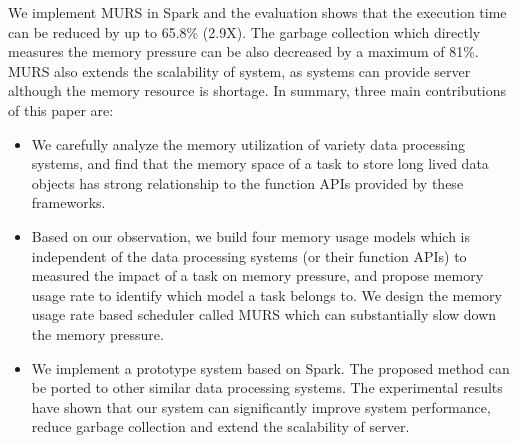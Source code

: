 

We implement MURS in Spark and the evaluation shows that the execution time can be reduced by up to 65.8\% (2.9X). The garbage collection which directly measures the memory pressure can be also decreased by a maximum of 81\%. MURS also extends the scalability of system, as systems can provide server although the memory resource is shortage. In summary, three main contributions of this paper are:

\begin{itemize}

\item We carefully analyze the memory utilization of variety data processing systems, and find that the memory space of a task to store long lived data objects has strong relationship to the function APIs provided by these frameworks.


\item Based on our observation, we build four memory usage models which is independent of the data processing systems (or their function APIs) to measured the impact of a task on memory pressure, and propose memory usage rate to identify which model a task belongs to. We design the memory usage rate based scheduler called MURS which can substantially slow down the memory pressure.


\item We implement a prototype system based on Spark. The proposed method can be ported to other similar data processing systems. The experimental results have shown that our system can significantly improve system performance, reduce garbage collection and extend the scalability of server.

\end{itemize}

